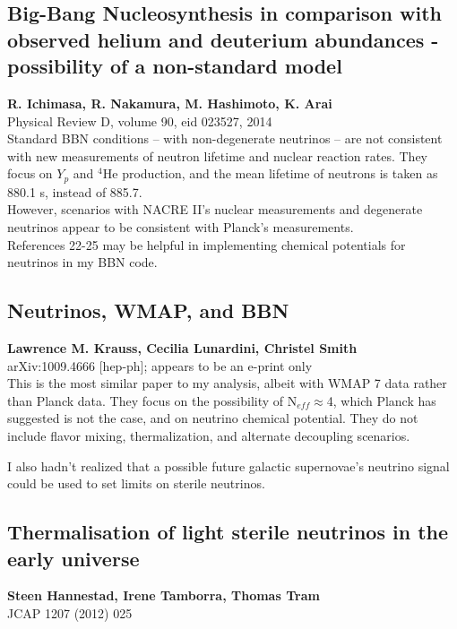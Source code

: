 \documentclass[english]{article}
\begin{document}
\subsection{Big-Bang Nucleosynthesis in comparison with observed helium and deuterium abundances - possibility of a non-standard model}
\noindent \textbf{R. Ichimasa, R. Nakamura, M. Hashimoto, K. Arai} \\
\noindent Physical Review D, volume 90, eid 023527, 2014 \\

\noindent Standard BBN conditions -- with non-degenerate neutrinos -- are not consistent with new measurements of neutron lifetime and nuclear reaction rates.  They focus on $Y_p$ and $^4$He production, and the mean lifetime of neutrons is taken as 880.1 s, instead of 885.7. \\

\noindent However, scenarios with NACRE II's nuclear measurements and degenerate neutrinos appear to be consistent with Planck's measurements. \\

\noindent References 22-25 may be helpful in implementing chemical potentials for neutrinos in my BBN code. \\

\subsection{Neutrinos, WMAP, and BBN}
\noindent \textbf{Lawrence M. Krauss, Cecilia Lunardini, Christel Smith} \\
\noindent arXiv:1009.4666 [hep-ph]; appears to be an e-print only \\

\noindent This is the most similar paper to my analysis, albeit with WMAP 7 data rather than Planck data.  They focus on the possibility of N$_{eff}\approx$4, which Planck has suggested is not the case, and on neutrino chemical potential.  They do not include flavor mixing, thermalization, and alternate decoupling scenarios.

\noindent I also hadn't realized that a possible future galactic supernovae's neutrino signal could be used to set limits on sterile neutrinos. \\

\subsection{Thermalisation of light sterile neutrinos in the early universe}
\noindent \textbf{Steen Hannestad, Irene Tamborra, Thomas Tram} \\
\noindent JCAP 1207 (2012) 025 \\
\end{document}
